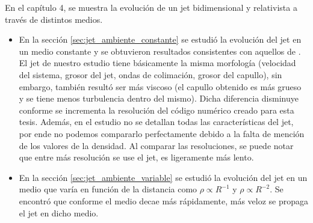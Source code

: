 \documentclass[12pt,a4paper]{book}
\begin{document}
En el capítulo 4, se muestra la evolución de un jet bidimensional y relativista a través de distintos medios. 
\begin{itemize}
	\item En la sección \ref{sec:jet_ambiente_constante} se estudió la evolución del jet en un medio constante y se obtuvieron resultados consistentes con aquellos de \citet{MB-HLLC-I}. El jet de nuestro estudio 
  tiene básicamente la misma morfología (velocidad del sistema, grosor del jet, ondas de colimación, grosor del capullo), sin embargo, también resultó ser más viscoso (el capullo obtenido es más grueso y 
  se tiene menos turbulencia dentro del mismo). Dicha diferencia disminuye conforme se incrementa la resolución del código numérico creado para esta tesis. Además, en el estudio \citet{MB-HLLC-I} no se detallan todas 
  las características del jet, por ende no podemos compararlo perfectamente debido a la falta de mención de los valores de la densidad. Al comparar las resoluciones, se puede notar que entre más resolución se use el jet, 
  es ligeramente más lento. 
	
	\item En la sección \ref{sec:jet_ambiente_variable} se estudió la evolución del jet en un medio que varía en función de la distancia como $\rho \propto R^{-1}$ y $\rho \propto R^{-2}$. Se encontró que conforme el 
  medio decae más rápidamente, más veloz se propaga el jet en dicho medio.
\end{itemize}
\end{document}
